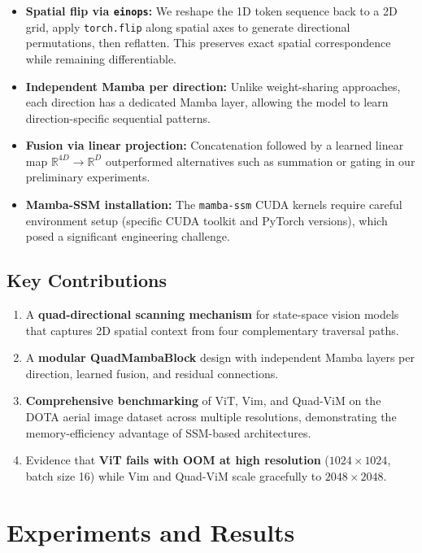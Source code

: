 \documentclass[conference]{IEEEtran}
\begin{document}
\begin{itemize}
\item \textbf{Spatial flip via \texttt{einops}:} We reshape the 1D token sequence back to a 2D grid, apply \texttt{torch.flip} along spatial axes to generate directional permutations, then reflatten. This preserves exact spatial correspondence while remaining differentiable.
\item \textbf{Independent Mamba per direction:} Unlike weight-sharing approaches, each direction has a dedicated Mamba layer, allowing the model to learn direction-specific sequential patterns.
\item \textbf{Fusion via linear projection:} Concatenation followed by a learned linear map $\mathbb{R}^{4D} \to \mathbb{R}^{D}$ outperformed alternatives such as summation or gating in our preliminary experiments.
\item \textbf{Mamba-SSM installation:} The \texttt{mamba-ssm} CUDA kernels require careful environment setup (specific CUDA toolkit and PyTorch versions), which posed a significant engineering challenge.
\end{itemize}

\subsection{Key Contributions}

\begin{enumerate}
\item A \textbf{quad-directional scanning mechanism} for state-space vision models that captures 2D spatial context from four complementary traversal paths.
\item A \textbf{modular QuadMambaBlock} design with independent Mamba layers per direction, learned fusion, and residual connections.
\item \textbf{Comprehensive benchmarking} of ViT, Vim, and Quad-ViM on the DOTA aerial image dataset across multiple resolutions, demonstrating the memory-efficiency advantage of SSM-based architectures.
\item Evidence that \textbf{ViT fails with OOM at high resolution} ($1024 \times 1024$, batch size 16) while Vim and Quad-ViM scale gracefully to $2048 \times 2048$.
\end{enumerate}

\section{Experiments and Results}
\end{document}
